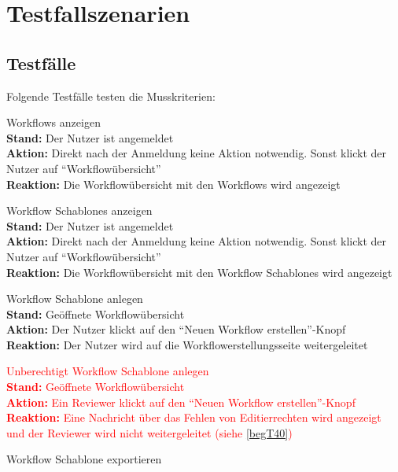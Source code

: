 \chapter{Testfallszenarien}

\section{Testfälle}
Folgende Testfälle testen die Musskriterien:
\renewcommand{\labelenumi}{/T\arabic{enumi}0/}
\begin{enumerate}
    \item \glspl{Workflow} anzeigen
        \\ \textbf{Stand:} Der \Gls{Nutzer} ist angemeldet
        \\ \textbf{Aktion:} Direkt nach der Anmeldung keine Aktion notwendig. Sonst klickt der \Gls{Nutzer} auf \enquote{Workflowübersicht}
        \\ \textbf{Reaktion:} Die Workflowübersicht mit den \glspl{Workflow} wird angezeigt
    \item \glspl{Workflow Schablone} anzeigen
        \\ \textbf{Stand:} Der \Gls{Nutzer} ist angemeldet
        \\ \textbf{Aktion:} Direkt nach der Anmeldung keine Aktion notwendig. Sonst klickt der \Gls{Nutzer} auf \enquote{Workflowübersicht}
        \\ \textbf{Reaktion:} Die Workflowübersicht mit den \glspl{Workflow Schablone} wird angezeigt
    \item \gls{Workflow Schablone} anlegen
        \\ \textbf{Stand:} Geöffnete Workflowübersicht
        \\ \textbf{Aktion:} Der \Gls{Nutzer} klickt auf den \enquote{Neuen Workflow erstellen}-Knopf
        \\ \textbf{Reaktion:} Der \Gls{Nutzer} wird auf die Workflowerstellungsseite weitergeleitet
        \textcolor{red} {
    \item Unberechtigt \gls{Workflow Schablone} anlegen
        \\ \textbf{Stand:} Geöffnete Workflowübersicht
        \\ \textbf{Aktion:} Ein \Gls{Reviewer} klickt auf den \enquote{Neuen Workflow erstellen}-Knopf
        \\ \textbf{Reaktion:} Eine Nachricht über das Fehlen von Editierrechten wird angezeigt und der \Gls{Reviewer} wird nicht weitergeleitet (siehe \ref{begT40})
        }
    \item \gls{Workflow Schablone} exportieren

\end{enumerate}
